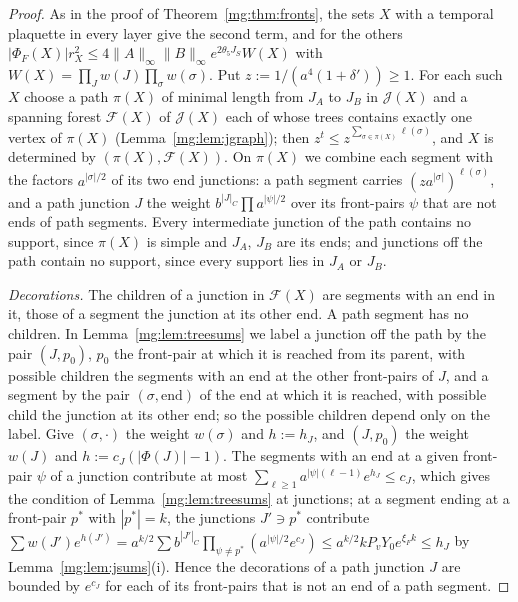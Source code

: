\documentclass[11pt,a4paper]{article}
\theoremstyle{definition}
\theoremstyle{remark}
\newcommand{\norm}[1]{\lVert #1\rVert}
\begin{document}
\begin{proof}
As in the proof of Theorem~\ref{mg:thm:fronts}, the sets $X$ with a temporal plaquette in every layer give the second term, and for the others
$|\Phi_F(X)|r_X^2\le4\norm A_\infty\norm B_\infty e^{2\theta_5J_S}W(X)$ with $W(X)=\prod_Jw(J)\prod_\sigma w(\sigma)$. Put $z:=1/(a^4(1+\delta'))\ge1$. For each
such $X$ choose a path $\pi(X)$ of minimal length from $J_A$ to $J_B$ in $\mathcal J(X)$ and a spanning forest $\mathcal F(X)$ of $\mathcal J(X)$ each of
whose trees contains exactly one vertex of $\pi(X)$ (Lemma~\ref{mg:lem:jgraph}); then $z^t\le z^{\sum_{\sigma\in\pi(X)}\ell(\sigma)}$, and $X$ is determined by
$(\pi(X),\mathcal F(X))$. On $\pi(X)$ we combine each segment with the factors $a^{|\sigma|/2}$ of its two end junctions: a path segment carries
$(za^{|\sigma|})^{\ell(\sigma)}$, and a path junction $J$ the weight $b^{|J|_C}\prod a^{|\psi|/2}$ over its front-pairs $\psi$ that are not ends of path segments.
Every intermediate junction of the path contains no support, since $\pi(X)$ is simple and $J_A$, $J_B$ are its ends; and junctions off the path contain
no support, since every support lies in $J_A$ or $J_B$.

\emph{Decorations.} The children of a junction in $\mathcal F(X)$ are segments with an end in it, those of a segment the junction at its other end. A
path segment has no children. In Lemma~\ref{mg:lem:treesums} we label a junction off the path by the pair $(J,p_0)$, $p_0$ the front-pair at which it is
reached from its parent, with possible children the segments with an end at the other front-pairs of $J$, and a segment by the pair $(\sigma,\text{end})$
of the end at which it is reached, with possible child the junction at its other end; so the possible children depend only on the label. Give
$(\sigma,\cdot)$ the weight $w(\sigma)$ and $h:=h_J$, and $(J,p_0)$ the weight $w(J)$ and $h:=c_J(|\Phi(J)|-1)$. The segments with an end at a given front-pair
$\psi$ of a junction contribute at most
$\sum_{\ell\ge1}a^{|\psi|(\ell-1)}e^{h_J}\le c_J$, which gives the condition of Lemma~\ref{mg:lem:treesums} at junctions; at a segment ending at a front-pair
$p^*$ with $|p^*|=k$, the junctions $J'\ni p^*$ contribute $\sum w(J')e^{h(J')}=a^{k/2}\sum b^{|J'|_C}\prod_{\psi\ne p^*}(a^{|\psi|/2}e^{c_J})\le
a^{k/2}kP_vY_0e^{\xi_Fk}\le h_J$ by Lemma~\ref{mg:lem:jsums}(i). Hence the decorations of a path junction $J$ are bounded by $e^{c_J}$ for each of its
front-pairs that is not an end of a path segment.


\end{proof}
\end{document}
